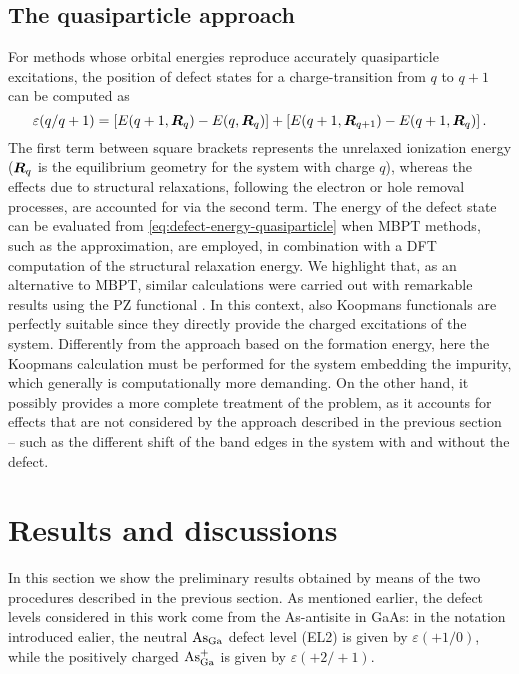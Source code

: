 \subsection{The quasiparticle approach\label{sec:defect-quasiparticle-approach}}
For methods whose orbital energies reproduce accurately quasiparticle excitations, the position of defect states for a charge-transition from $q$ to $q+1$ can be computed as \cite{chen_first-principles_2015}
%
\begin{equation}
    \varepsilon(q/q+1) = \left[ E(q+1,{\bm R}_q) - E(q,{\bm R}_q) \right] + \left[ E(q+1,{\bm R}_{q+1}) - E(q+1,{\bm R}_q) \right] .
    \label{eq:defect-energy-quasiparticle}
\end{equation}
%
The first term between square brackets represents the unrelaxed ionization energy (${\bm R}_q$ is the equilibrium geometry for the system with charge $q$), whereas the effects due to structural relaxations, following the electron or hole removal processes, are accounted for via the second term. The energy of the defect state can be evaluated from \cref{eq:defect-energy-quasiparticle} when MBPT methods, such as the \gw approximation, are employed, in combination with a DFT computation of the structural relaxation energy. We highlight that, as an alternative to MBPT, similar calculations were carried out with remarkable results using the PZ functional \cite{gudmundsdottir_calculations_2015}. In this context, also Koopmans functionals are perfectly suitable since they directly provide the charged excitations of the system. Differently from the approach based on the formation energy, here the Koopmans calculation must be performed for the system embedding the impurity, which generally is computationally more demanding. On the other hand, it possibly provides a more complete treatment of the problem, as it accounts for effects that are not considered by the approach described in the previous section -- such as the different shift of the band edges in the system with and without the defect.

\section{Results and discussions\label{sec:defects-results}}
In this section we show the preliminary results obtained by means of the two procedures described in the previous section. As mentioned earlier, the defect levels considered in this work come from the As-antisite in GaAs: in the notation introduced ealier, the neutral $\rm As_{Ga}$ defect level (EL2) is given by $\varepsilon(+1/0)$, while the positively charged $\rm As_{Ga}^+$ is given by $\varepsilon(+2/+1)$.

